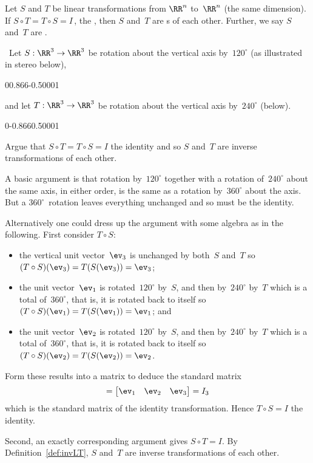 \begin{definition} \label{def:invLT} 
Let \(S\) and \(T\) be linear transformations from \(\RR^n\) to~\(\RR^n\) (the same dimension).
If \(S\circ T=T\circ S=I\)\,, the , then \(S\) and~\(T\) are s of each other.  
Further, we say \(S\) and~\(T\) are .
\end{definition}



\begin{example} \label{eg:}\ 
Let \(S:\RR^3\to\RR^3\) be rotation about the vertical axis by~\(120^\circ\) (as illustrated in stereo below), 
\begin{center}
0{0.866}{-0.5}0001
\end{center}
and let \(T:\RR^3\to\RR^3\) be rotation about the vertical axis by~\(240^\circ\) (below).
\begin{center}
0{-0.866}{0.5}0001
\end{center}
Argue that \(S\circ T=T\circ S=I\) the identity and so \(S\) and~\(T\) are {inverse transformation}s of each other.
\begin{solution} 
A basic argument is that rotation by~\(120^\circ\) together with a rotation of~\(240^\circ\) about the same axis, in either order, is the same as a rotation by~\(360^\circ\) about the axis.
But a \(360^\circ\)~rotation leaves everything unchanged and so must be the identity.

Alternatively one could dress up the argument with some algebra as in the following.
First consider \(T\circ S\):
\begin{itemize}
\item the vertical unit vector~\(\ev_3\) is unchanged by both~\(S\) and~\(T\) so \((T\circ S)(\ev_3)=T(S(\ev_3))=\ev_3\);
\item the unit vector~\(\ev_1\) is rotated~\(120^\circ\) by~\(S\), and then by~\(240^\circ\) by~\(T\) which is a total of~\(360^\circ\), that is, it is rotated back to itself so \((T\circ S)(\ev_1)=T(S(\ev_1))=\ev_1\); and
\item the unit vector~\(\ev_2\) is rotated~\(120^\circ\) by~\(S\), and then by~\(240^\circ\) by~\(T\) which is a total of~\(360^\circ\), that is, it is rotated back to itself so \((T\circ S)(\ev_2)=T(S(\ev_2))=\ev_2\).
\end{itemize}
Form these results into a matrix to deduce the standard matrix
\begin{equation*}
[T\circ S]=\begin{bmatrix} \ev_1&\ev_2&\ev_3 \end{bmatrix}
=I_3
\end{equation*}
which is the standard matrix of the identity transformation.
Hence \(T\circ S=I\) the identity.

Second, an exactly corresponding argument gives  \(S\circ T=I\).
By Definition~\ref{def:invLT}, \(S\) and~\(T\) are inverse transformations of each other.
\end{solution}
\end{example}



